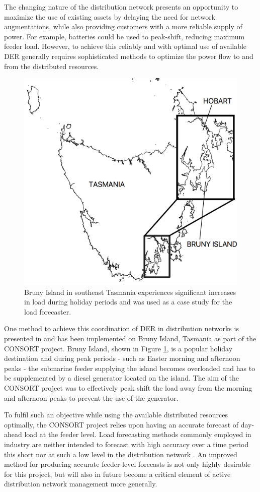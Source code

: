 \documentclass[conference]{IEEEtran}
\begin{document}
The changing nature of the distribution network presents an opportunity to maximize the use of existing assets by delaying the need for network augmentations, while also providing customers with a more reliable supply of power.
For example, batteries could be used to peak-shift, reducing maximum feeder load.
However, to achieve this reliably and with optimal use of available DER generally requires sophisticated methods to optimize the power flow to and from the distributed resources.

\begin{figure}[htbp]
	\centerline{\includegraphics[width=.35\textwidth]{images/bruny_island_map.png}}
	\caption{Bruny Island in southeast Tasmania experiences significant increases in load during holiday periods and was used as a case study for the load forecaster.}
	\label{fig:bruny_map}
\end{figure}

One method to achieve this coordination of DER in distribution networks is presented in \cite{Scott2014} and has been implemented on Bruny Island, Tasmania as part of the CONSORT project.
Bruny Island, shown in Figure \ref{fig:bruny_map}, is a popular holiday destination and during peak periods - such as Easter morning and afternoon peaks - the submarine feeder supplying the island becomes overloaded and has to be supplemented by a diesel generator located on the island.
The aim of the CONSORT project was to effectively peak shift the load away from the morning and afternoon peaks to prevent the use of the generator.

To fulfil such an objective while using the available distributed resources optimally, the CONSORT project relies upon having an accurate forecast of day-ahead load at the feeder level.
Load forecasting methods commonly employed in industry are neither intended to forecast with high accuracy over a time period this short nor at such a low level in the distribution network \cite{CIGRE2016}.
An improved method for producing accurate feeder-level forecasts is not only highly desirable for this project, but will also in future become a critical element of active distribution network management more generally.
\end{document}
